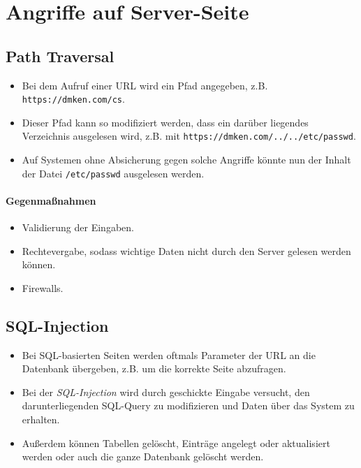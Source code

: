 	\section{Angriffe auf Server-Seite}
		\subsection{Path Traversal}
			\begin{itemize}
				\item Bei dem Aufruf einer URL wird ein Pfad angegeben, z.B. \texttt{https://dmken.com/cs}.
				\item Dieser Pfad kann so modifiziert werden, dass ein darüber liegendes Verzeichnis ausgelesen wird, z.B. mit \texttt{https://dmken.com/../../etc/passwd}.
				\item Auf Systemen ohne Absicherung gegen solche Angriffe könnte nun der Inhalt der Datei \texttt{/etc/passwd} ausgelesen werden.
			\end{itemize}

			\paragraph{Gegenmaßnahmen}
				\begin{itemize}
					\item Validierung der Eingaben.
					\item Rechtevergabe, sodass wichtige Daten nicht durch den Server gelesen werden können.
					\item Firewalls.
				\end{itemize}

		\subsection{SQL-Injection}
			\begin{itemize}
				\item Bei SQL-basierten Seiten werden oftmals Parameter der URL an die Datenbank übergeben, z.B. um die korrekte Seite abzufragen.
				\item Bei der \textit{SQL-Injection} wird durch geschickte Eingabe versucht, den darunterliegenden SQL-Query zu modifizieren und Daten über das System zu erhalten.
				\item Außerdem können Tabellen gelöscht, Einträge angelegt oder aktualisiert werden oder auch die ganze Datenbank gelöscht werden.
			\end{itemize}

